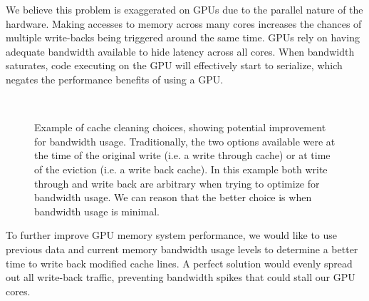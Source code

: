 We believe this problem is exaggerated on GPUs due to the parallel nature of the hardware. Making accesses to memory across many cores increases the chances of multiple write-backs being triggered around the same time. GPUs rely on having adequate bandwidth available to hide latency across all cores. When bandwidth saturates, code executing on the GPU will effectively start to serialize, which negates the performance benefits of using a GPU. 

\begin{figure}[htb]
\begin{center}
\ 
\caption{Example of cache cleaning choices, showing potential improvement for bandwidth usage. Traditionally, the two options available were at the time of the original write (i.e. a write through cache) or at time of the eviction (i.e. a write back cache). In this example both write through and write back are arbitrary when trying to optimize for bandwidth usage. We can reason that the better choice is when bandwidth usage is minimal.}
\label{f:bandwidth_optimal}
\end{center}
\end{figure}
%

To further improve GPU memory system performance, we would like to use previous data and current memory bandwidth usage levels to determine a better time to write back modified cache lines. A perfect solution would evenly spread out all write-back traffic, preventing bandwidth spikes that could stall our GPU cores.
